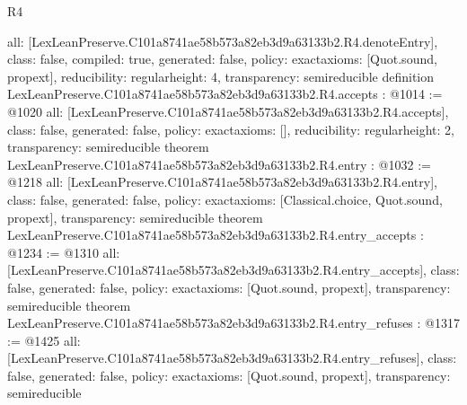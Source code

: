 \begin{lexlean}{R4}
\begin{coremodule}
{  all: [LexLeanPreserve.C101a8741ae58b573a82eb3d9a63133b2.R4.denoteEntry],
  class: false,
  compiled: true,
  generated: false,
  policy: exact{axioms: [Quot.sound, propext]},
  reducibility: regular{height: 4},
  transparency: semireducible
}
definition LexLeanPreserve.C101a8741ae58b573a82eb3d9a63133b2.R4.accepts : @1014 := @1020 {
  all: [LexLeanPreserve.C101a8741ae58b573a82eb3d9a63133b2.R4.accepts],
  class: false,
  generated: false,
  policy: exact{axioms: []},
  reducibility: regular{height: 2},
  transparency: semireducible
}
theorem LexLeanPreserve.C101a8741ae58b573a82eb3d9a63133b2.R4.entry : @1032 := @1218 {
  all: [LexLeanPreserve.C101a8741ae58b573a82eb3d9a63133b2.R4.entry],
  class: false,
  generated: false,
  policy: exact{axioms: [Classical.choice, Quot.sound, propext]},
  transparency: semireducible
}
theorem LexLeanPreserve.C101a8741ae58b573a82eb3d9a63133b2.R4.entry_accepts : @1234 := @1310 {
  all: [LexLeanPreserve.C101a8741ae58b573a82eb3d9a63133b2.R4.entry_accepts],
  class: false,
  generated: false,
  policy: exact{axioms: [Quot.sound, propext]},
  transparency: semireducible
}
theorem LexLeanPreserve.C101a8741ae58b573a82eb3d9a63133b2.R4.entry_refuses : @1317 := @1425 {
  all: [LexLeanPreserve.C101a8741ae58b573a82eb3d9a63133b2.R4.entry_refuses],
  class: false,
  generated: false,
  policy: exact{axioms: [Quot.sound, propext]},
  transparency: semireducible
}


\end{coremodule}
\end{lexlean}
